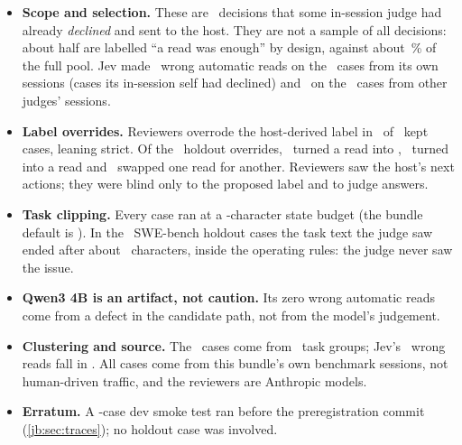 \begin{caution}[title={Read this before generalizing}]
\begin{itemize}[leftmargin=1.1em]
  \item \textbf{Scope and selection.} These are \TrN\ decisions that some in-session judge had already
    \emph{declined} and sent to the host. They are not a sample of all decisions: about half are labelled
    ``a read was enough'' by design, against about \TrPoolReadPct\,\% of the full pool. Jev made
    \TrJevOwnWa\ wrong automatic reads on the \TrJevOwnN\ cases from its own sessions (cases its
    in-session self had declined) and \TrJevOtherWa\ on the \TrJevOtherN\ cases from other judges'
    sessions.
  \item \textbf{Label overrides.} Reviewers overrode the host-derived label in \TrOverridden\ of
    \TrKept\ kept cases, leaning strict. Of the \TrHoldOverrides\ holdout overrides, \TrOverReadToReason\
    turned a read into , \TrOverReasonToRead\ turned  into a read and
    \TrOverReadToRead\ swapped one read for another. Reviewers saw the host's next actions; they were blind
    only to the proposed label and to judge answers.
  \item \textbf{Task clipping.} Every case ran at a \TrStateBudget-character state budget (the bundle
    default is \TrStateDefault). In the \TrSThree\ SWE-bench holdout cases the task text the judge saw ended
    after about \TrTaskSeen\ characters, inside the operating rules: the judge never saw the issue.
  \item \textbf{Qwen3 4B is an artifact, not caution.} Its zero wrong automatic reads come from a defect
    in the candidate path, not from the model's judgement.
  \item \textbf{Clustering and source.} The \TrN\ cases come from \TrGroups\ task groups; Jev's
    \TrJevWaK\ wrong reads fall in \TrJevWrongGroups. All cases come from this bundle's own benchmark
    sessions, not human-driven traffic, and the reviewers are Anthropic models.
  \item \textbf{Erratum.} A \TrSmokeCases-case dev smoke test ran before the preregistration commit
    (\cref{jb:sec:traces}); no holdout case was involved.
\end{itemize}
\end{caution}

